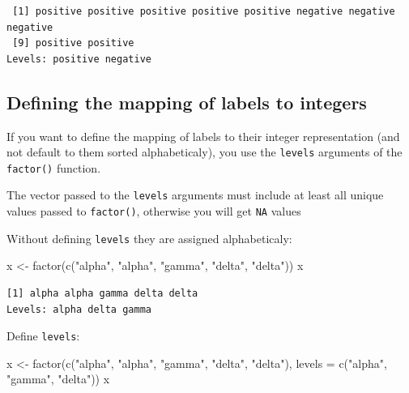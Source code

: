 \documentclass[
]{book}
\newenvironment{Shaded}{\begin{snugshade}}{\end{snugshade}}
\newcommand{\AttributeTok}[1]{\textcolor[rgb]{0.77,0.63,0.00}{#1}}
\newcommand{\FunctionTok}[1]{\textcolor[rgb]{0.00,0.00,0.00}{#1}}
\newcommand{\NormalTok}[1]{#1}
\newcommand{\OtherTok}[1]{\textcolor[rgb]{0.56,0.35,0.01}{#1}}
\newcommand{\StringTok}[1]{\textcolor[rgb]{0.31,0.60,0.02}{#1}}
\begin{document}
\begin{verbatim}
 [1] positive positive positive positive positive negative negative negative
 [9] positive positive
Levels: positive negative
\end{verbatim}

\hypertarget{defining-the-mapping-of-labels-to-integers}{%
\subsection{Defining the mapping of labels to integers}\label{defining-the-mapping-of-labels-to-integers}}

If you want to define the mapping of labels to their integer representation (and not default to them sorted alphabeticaly), you use the \texttt{levels} arguments of the \texttt{factor()} function.

The vector passed to the \texttt{levels} arguments must include at least all unique values passed to \texttt{factor()}, otherwise you will get \texttt{NA} values

Without defining \texttt{levels} they are assigned alphabeticaly:

\begin{Shaded}
\begin{Highlighting}[]
\NormalTok{x }\OtherTok{\textless{}{-}} \FunctionTok{factor}\NormalTok{(}\FunctionTok{c}\NormalTok{(}\StringTok{"alpha"}\NormalTok{, }\StringTok{"alpha"}\NormalTok{, }\StringTok{"gamma"}\NormalTok{, }\StringTok{"delta"}\NormalTok{, }\StringTok{"delta"}\NormalTok{))}
\NormalTok{x}
\end{Highlighting}
\end{Shaded}

\begin{verbatim}
[1] alpha alpha gamma delta delta
Levels: alpha delta gamma
\end{verbatim}

Define \texttt{levels}:

\begin{Shaded}
\begin{Highlighting}[]
\NormalTok{x }\OtherTok{\textless{}{-}} \FunctionTok{factor}\NormalTok{(}\FunctionTok{c}\NormalTok{(}\StringTok{"alpha"}\NormalTok{, }\StringTok{"alpha"}\NormalTok{, }\StringTok{"gamma"}\NormalTok{, }\StringTok{"delta"}\NormalTok{, }\StringTok{"delta"}\NormalTok{),}
 \AttributeTok{levels =} \FunctionTok{c}\NormalTok{(}\StringTok{"alpha"}\NormalTok{, }\StringTok{"gamma"}\NormalTok{, }\StringTok{"delta"}\NormalTok{))}
\NormalTok{x}
\end{Highlighting}
\end{Shaded}
\end{document}
